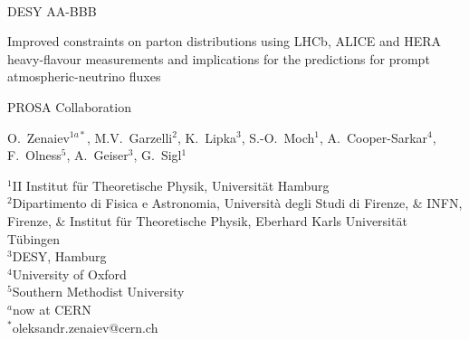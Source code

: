 \documentclass[12pt]{article}
\begin{document}
\begin{titlepage}
\noindent
\\
DESY AA-BBB %
\\

\vspace{1.0cm}

\begin{center}
  {\bf 

\large

Improved constraints on parton distributions using LHCb, ALICE and HERA heavy-flavour measurements and implications for the predictions for prompt atmospheric-neutrino fluxes 
  }
  \vspace{1.0cm}

  {\large
    PROSA Collaboration
  }\\

  \vspace{0.4cm}

\end{center}
\noindent
O.~Zenaiev$^{1a*}$, \mbox{M.V.~Garzelli}$^{2}$, K.~Lipka$^{3}$, \mbox{S.-O.~Moch}$^{1}$, A.~Cooper-Sarkar$^{4}$, F.~Olness$^{5}$, A.~Geiser$^{3}$, G.~Sigl$^{1}$\\


\noindent


{\footnotesize{
		\noindent
		$^{1}$II Institut f\"ur Theoretische Physik, Universit\"at Hamburg\\
		$^{2}$Dipartimento di Fisica e Astronomia, Universit\`a degli Studi di Firenze, \& INFN, Firenze, \& Institut f\"ur Theoretische Physik, Eberhard Karls Universit\"at T\"ubingen\\
		$^{3}${DESY, Hamburg}\\
		$^{4}$University of Oxford\\
		$^{5}$Southern Methodist University\\
		$^{a}$now at CERN\\
    
    \noindent
		$^{*}$oleksandr.zenaiev@cern.ch\\
	}
}


\end{titlepage}
\end{document}
